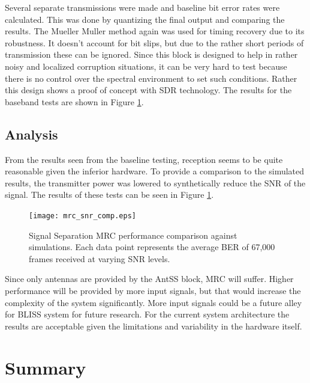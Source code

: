 Several separate transmissions were made and baseline bit error rates were calculated.  This was done by quantizing the final output and comparing the results.  The Mueller Muller method again was used for timing recovery due to its robustness.  It doesn't account for bit slips, but due to the rather short periods of transmission these can be ignored.  Since this block is designed to help in rather noisy and localized corruption situations, it can be very hard to test because there is no control over the spectral environment to set such conditions.  Rather this design shows a proof of concept with SDR technology.  The results for the baseband tests are shown in Figure \ref{ssep_snr_tests}.\\


\subsection{Analysis}

From the results seen from the baseline testing, reception seems to be quite reasonable given the inferior hardware. To provide a comparison to the simulated results, the transmitter power was lowered to synthetically reduce the SNR of the signal.  The results of these tests can be seen in Figure \ref{ssep_snr_tests}.   

\begin{figure}[!ht]
\centering
\texttt{[image: mrc\_snr\_comp.eps]} %
\caption{Signal Separation MRC performance comparison against simulations.  Each data point represents the average BER of 67,000 frames received at varying SNR levels.}
\label{ssep_snr_tests}
\end{figure}

Since only antennas are provided by the AntSS block, MRC will suffer.  Higher performance will be provided by more input signals, but that would increase the complexity of the system significantly.  More input signals could be a future alley for BLISS system for future research.  For the current system architecture the results are acceptable given the limitations and variability in the hardware itself.\\


\section{Summary}

